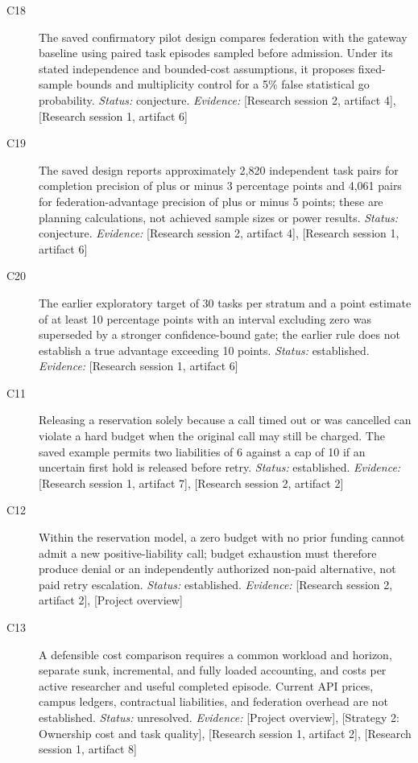 \documentclass[11pt]{article}
\begin{document}
\begin{sloppypar}
\begin{description}
\item[C18] The saved confirmatory pilot design compares federation with the gateway baseline using paired task episodes sampled before admission. Under its stated independence and bounded-cost assumptions, it proposes fixed-sample bounds and multiplicity control for a 5\% false statistical go probability. \textit{Status: }conjecture.
\textit{Evidence: }[Research session 2, artifact 4], [Research session 1, artifact 6]
\item[C19] The saved design reports approximately 2,820 independent task pairs for completion precision of plus or minus 3 percentage points and 4,061 pairs for federation-advantage precision of plus or minus 5 points; these are planning calculations, not achieved sample sizes or power results. \textit{Status: }conjecture.
\textit{Evidence: }[Research session 2, artifact 4], [Research session 1, artifact 6]
\item[C20] The earlier exploratory target of 30 tasks per stratum and a point estimate of at least 10 percentage points with an interval excluding zero was superseded by a stronger confidence-bound gate; the earlier rule does not establish a true advantage exceeding 10 points. \textit{Status: }established.
\textit{Evidence: }[Research session 1, artifact 6]
\item[C11] Releasing a reservation solely because a call timed out or was cancelled can violate a hard budget when the original call may still be charged. The saved example permits two liabilities of 6 against a cap of 10 if an uncertain first hold is released before retry. \textit{Status: }established.
\textit{Evidence: }[Research session 1, artifact 7], [Research session 2, artifact 2]
\item[C12] Within the reservation model, a zero budget with no prior funding cannot admit a new positive-liability call; budget exhaustion must therefore produce denial or an independently authorized non-paid alternative, not paid retry escalation. \textit{Status: }established.
\textit{Evidence: }[Research session 2, artifact 2], [Project overview]
\item[C13] A defensible cost comparison requires a common workload and horizon, separate sunk, incremental, and fully loaded accounting, and costs per active researcher and useful completed episode. Current API prices, campus ledgers, contractual liabilities, and federation overhead are not established. \textit{Status: }unresolved.
\textit{Evidence: }[Project overview], [Strategy 2: Ownership cost and task quality], [Research session 1, artifact 2], [Research session 1, artifact 8]

\end{description}
\end{sloppypar}
\end{document}
